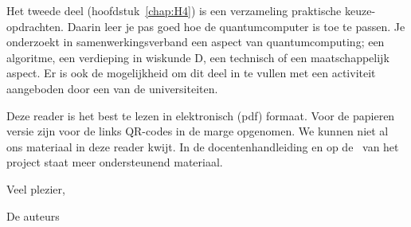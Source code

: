 \documentclass[../main.tex]{subfiles}
\begin{document}
Het tweede deel (hoofdstuk~\ref{chap:H4}) is een verzameling praktische keuze-opdrachten. Daarin leer je pas goed hoe de quantumcomputer is toe te passen. Je onderzoekt in samenwerkingsverband een aspect van quantumcomputing; een algoritme, een verdieping in wiskunde D, een technisch of een maatschappelijk aspect. Er is ook de mogelijkheid om dit deel in te vullen met een activiteit aangeboden door een van de universiteiten. 

{}

Deze reader is het best te lezen in elektronisch (pdf) formaat. Voor de papieren versie zijn voor de links QR-codes in de marge opgenomen. We kunnen niet al ons materiaal in deze reader kwijt. In de docentenhandleiding en op de~ van het project staat meer ondersteunend materiaal.

\bigskip
Veel plezier,

De auteurs
\end{document}
